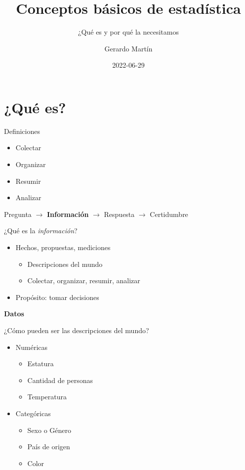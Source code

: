 \documentclass[
  11pt,
  ignorenonframetext,
]{beamer}
\title{Conceptos básicos de estadística}
\subtitle{¿Qué es y por qué la necesitamos}
\author{Gerardo Martín}
\date{2022-06-29}
\providecommand{\tightlist}{%
  \setlength{\itemsep}{0pt}\setlength{\parskip}{0pt}}
\begin{document}
\frame{\titlepage}

\hypertarget{quuxe9-es}{%
\section{¿Qué es?}\label{quuxe9-es}}

\begin{frame}{Definiciones}
\protect\hypertarget{definiciones}{}
\begin{itemize}
\tightlist
\item
  Colectar
\item
  Organizar
\item
  Resumir
\item
  Analizar
\end{itemize}

Pregunta \(\rightarrow\) \textbf{Información} \(\rightarrow\) Respuesta
\(\rightarrow\) Certidumbre
\end{frame}

\begin{frame}{¿Qué es la \emph{información}?}
\protect\hypertarget{quuxe9-es-la-informaciuxf3n}{}
\begin{itemize}
\item
  Hechos, propuestas, mediciones

  \begin{itemize}
  \tightlist
  \item
    Descripciones del mundo
  \item
    Colectar, organizar, resumir, analizar
  \end{itemize}
\item
  Propósito: tomar decisiones
\end{itemize}

\textbf{Datos}
\end{frame}

\begin{frame}{¿Cómo pueden ser las descripciones del mundo?}
\protect\hypertarget{cuxf3mo-pueden-ser-las-descripciones-del-mundo}{}
\begin{itemize}
\item
  Numéricas

  \begin{itemize}
  \tightlist
  \item
    Estatura
  \item
    Cantidad de personas
  \item
    Temperatura
  \end{itemize}
\item
  Categóricas

  \begin{itemize}
  \tightlist
  \item
    Sexo o Género
  \item
    País de origen
  \item
    Color
  \end{itemize}
\end{itemize}
\end{frame}
\end{document}
